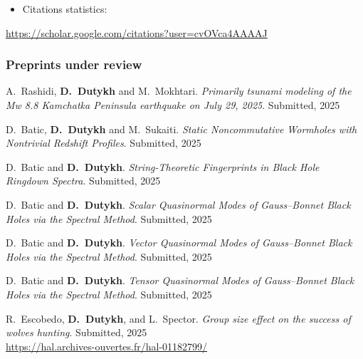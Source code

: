 \documentclass[final, a4paper, oneside, 12pt]{article}
\numberwithin{equation}{section}
\begin{document}
\begin{itemize}
  \item Citations statistics:
\end{itemize}

\begin{center}
  \url{https://scholar.google.com/citations?user=cvOVca4AAAAJ}
\end{center}

\subsubsection{Preprints under review}

\begin{etaremune}

  \item A.~Rashidi, \textbf{D.~Dutykh} and M.~Mokhtari. \textit{Primarily tsunami modeling of the Mw 8.8 Kamchatka Peninsula earthquake on July 29, 2025}. Submitted, 2025 %

  \item D.~Batic, \textbf{D.~Dutykh} and M.~Sukaiti. \textit{Static Noncommutative Wormholes with Nontrivial Redshift Profiles}. Submitted, 2025 \\ %

  \item D.~Batic and \textbf{D.~Dutykh}. \textit{String-Theoretic Fingerprints in Black Hole Ringdown Spectra}. Submitted, 2025 %

  \item D.~Batic and \textbf{D.~Dutykh}. \textit{Scalar Quasinormal Modes of Gauss--Bonnet Black Holes via the Spectral Method}. Submitted, 2025 %

  \item D.~Batic and \textbf{D.~Dutykh}. \textit{Vector Quasinormal Modes of Gauss--Bonnet Black Holes via the Spectral Method}. Submitted, 2025 %
  
  \item D.~Batic and \textbf{D.~Dutykh}. \textit{Tensor Quasinormal Modes of Gauss--Bonnet Black Holes via the Spectral Method}. Submitted, 2025 %

  \item R.~Escobedo, \textbf{D.~Dutykh}, and L.~Spector. \textit{Group size effect on the success of wolves hunting}. Submitted, 2025 \\ %
  \url{https://hal.archives-ouvertes.fr/hal-01182799/}


\end{etaremune}
\end{document}
